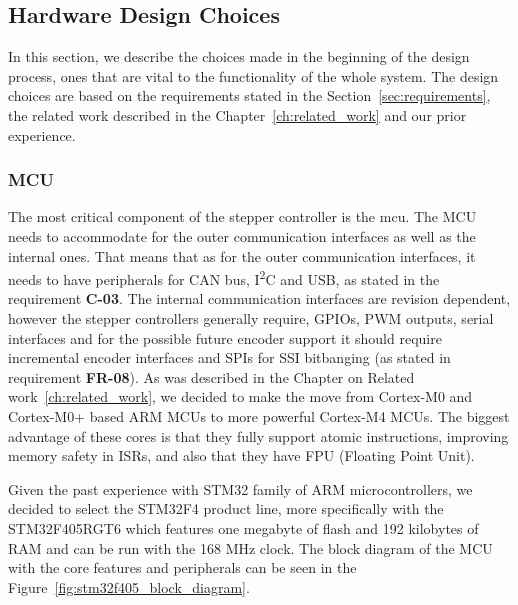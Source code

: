 \subsection{Hardware Design Choices}
\label{subsec:hardware_design_choices}
In this section, we describe the choices made in the beginning of the design process, ones that are vital to the functionality of the whole system.
The design choices are based on the requirements stated in the Section~\ref{sec:requirements}, the related work described in the Chapter~\ref{ch:related_work} and our prior experience.

\subsubsection{MCU}
\label{subsubsec:mcu}
The most critical component of the stepper controller is the \acs{mcu}.
The MCU needs to accommodate for the outer communication interfaces as well as the internal ones.
That means that as for the outer communication interfaces, it needs to have peripherals for CAN bus, I\textsuperscript{2}C and USB, as stated in the requirement \textbf{C-03}.
The internal communication interfaces are revision dependent, however the stepper controllers generally require, GPIOs, PWM outputs, serial interfaces and for the possible future encoder support it should require incremental encoder interfaces and SPIs for SSI bitbanging (as stated in requirement \textbf{FR-08}).
As was described in the Chapter on Related work~\ref{ch:related_work}, we decided to make the move from Cortex-M0 and Cortex-M0+ based ARM MCUs to more powerful Cortex-M4 MCUs.
The biggest advantage of these cores is that they fully support atomic instructions, improving memory safety in ISRs, and also that they have FPU (Floating Point Unit).

Given the past experience with STM32 family of ARM microcontrollers, we decided to select the STM32F4 product line, more specifically with the STM32F405RGT6 which features one megabyte of flash and 192 kilobytes of RAM and can be run with the 168 MHz clock\cite{stmicro_stm32f405rg_nodate}.
The block diagram of the MCU with the core features and peripherals can be seen in the Figure~\ref{fig:stm32f405_block_diagram}.


